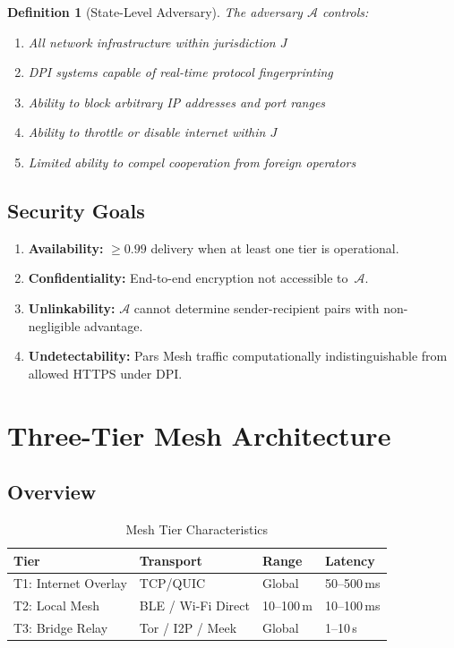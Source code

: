 \documentclass[11pt,a4paper]{article}
\newtheorem{definition}{Definition}[section]
\begin{document}
\begin{definition}[State-Level Adversary]
    The adversary $\mathcal{A}$ controls:
    \begin{enumerate}[label=(\alph*)]
        \item All network infrastructure within jurisdiction $J$
        \item DPI systems capable of real-time protocol fingerprinting
        \item Ability to block arbitrary IP addresses and port ranges
        \item Ability to throttle or disable internet within $J$
        \item Limited ability to compel cooperation from foreign operators
    \end{enumerate}
\end{definition}

\subsection{Security Goals}

\begin{enumerate}
    \item \textbf{Availability:} $\geq 0.99$ delivery when at least one
    tier is operational.
    \item \textbf{Confidentiality:} End-to-end encryption not accessible
    to~$\mathcal{A}$.
    \item \textbf{Unlinkability:} $\mathcal{A}$ cannot determine
    sender-recipient pairs with non-negligible advantage.
    \item \textbf{Undetectability:} Pars Mesh traffic computationally
    indistinguishable from allowed HTTPS under DPI.
\end{enumerate}

\section{Three-Tier Mesh Architecture}
\label{sec:architecture}

\subsection{Overview}

\begin{table}[h]
\centering
\caption{Mesh Tier Characteristics}
\label{tab:tiers}
\begin{tabular}{@{}llll@{}}
\toprule
\textbf{Tier} & \textbf{Transport} & \textbf{Range} & \textbf{Latency} \\
\midrule
T1: Internet Overlay & TCP/QUIC          & Global    & 50--500\,ms \\
T2: Local Mesh       & BLE / Wi-Fi Direct & 10--100\,m & 10--100\,ms \\
T3: Bridge Relay     & Tor / I2P / Meek  & Global    & 1--10\,s \\
\bottomrule
\end{tabular}
\end{table}
\end{document}
